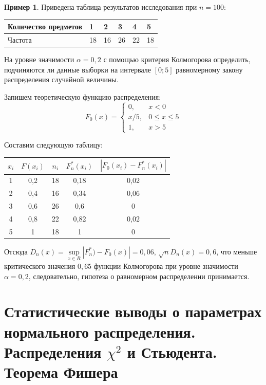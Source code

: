 \documentclass[oneside,final,14pt]{extreport}
\theoremstyle{plain}
\theoremstyle{definition}
\newtheorem*{exmp}{Пример}
\theoremstyle{named}
\begin{document}
\begin{exmp}
Приведена таблица результатов исследования при $n=100$:
\begin{center}
    \begin{tabular}{|l|l|l|l|l|l|}
    \hline Количество предметов & 1 & 2 & 3 & 4 & 5 \\
    \hline Частота & 18 & 16 & 26 & 22 & 18 \\
    \hline
\end{tabular}
\end{center}
На уровне значимости $\alpha=0,2$ с помощью критерия Колмогорова определить, подчиняются ли данные выборки на интервале $[0;5]$ равномерному закону распределения случайной величины.

Запишем теоретическую функцию распределения:
\begin{equation*}
    F_{0}(x)=\left\{\begin{array}{cc}
    0, & x<0 \\
    x/5, & 0 \leqslant x \leqslant 5 \\
    1, & x>5
    \end{array}\right.
\end{equation*}

Составим следующую таблицу:
\begin{center}
    \begin{tabular}{|c|c|c|c|c|}
    \hline $x_{i}$ & $F(x_{i})$ & $n_{i}$ & $F^{*}_{n}(x_{i})$ & $|F_{0}(x_{i})-F^{*}_{n}(x_{i})|$ \\
    \hline 1 & 0,2 & 18 & 0,18 & 0,02 \\
    \hline 2 & 0,4 & 16 & 0,34 & 0,06 \\
    \hline 3 & 0,6 & 26 & 0,6 & 0 \\
    \hline 4 & 0,8 & 22 & 0,82 & 0,02 \\
    \hline 5 & 1 & 18 & 1 & 0 \\
\hline
\end{tabular}
\end{center}
Отсюда $D_{n}(x)=\sup\limits_{x \in R}\left|F_{n}^{*})-F_{0}(x)\right| = 0,06$, $\sqrt{n}D_{n}(x) = 0,6$, что меньше критического значения $0,65$ функции Колмогорова при уровне значимости $\alpha=0,2$, следовательно, гипотеза о равномерном распределении принимается.
\end{exmp}

\section{Статистические выводы о параметрах нормального распределения. Распределения $\chi^{2}$ и Стьюдента. Теорема Фишера}
\end{document}
